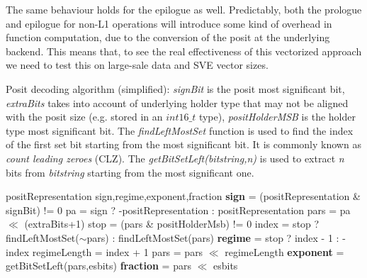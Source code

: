 The same behaviour holds for the epilogue as well.
Predictably, both the prologue and epilogue for non-L1 operations will introduce some kind of overhead in function computation, due to the conversion of the posit at the underlying backend. This means that, to see the real effectiveness of this vectorized approach we need to test this on large-sale data and SVE vector sizes.



\begin{algorithm}
 \caption{Posit decoding algorithm (simplified): \textit{signBit} is the posit most significant bit, \textit{extraBits} takes into account of underlying holder type that may not be aligned with the posit size (e.g.  stored in an $int16\_t$ type), \textit{positHolderMSB} is the holder type most significant bit. The \textit{findLeftMostSet} function is used to find the index of the first set bit starting from the most significant bit. It is commonly known as \textit{count leading zeroes} (CLZ). The \textit{getBitSetLeft(bitstring,n)} is used to extract \textit{n} bits from \textit{bitstring} starting from the most significant one.}
 \label{alg:positdec}
 \begin{algorithmic}[1]
 \renewcommand{\algorithmicrequire}{\textbf{Input:}}
 \renewcommand{\algorithmicensure}{\textbf{Output:}}
 \Require positRepresentation
 \Ensure sign,regime,exponent,fraction
    \State \textbf{sign} = (positRepresentation \& signBit) != 0
    \State pa = sign ? -positRepresentation : positRepresentation
    \State pars = pa $\ll$ (extraBits+1)
    \State stop = (pars \& positHolderMsb) != 0
    \State index = stop ? findLeftMostSet($\sim$pars) : findLeftMostSet(pars)
    \State \textbf{regime} = stop ? index - 1 : -index
    \State regimeLength = index + 1
    \State pars = pars $\ll$ regimeLength
    \State \textbf{exponent} = getBitSetLeft(pars,esbits)
    \State \textbf{fraction} = pars $\ll$ esbits 
\end{algorithmic} 
\end{algorithm}


